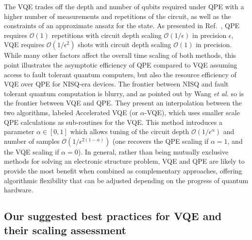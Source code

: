 The VQE trades off the depth and number of qubits required under QPE with a higher number of measurements and repetitions of the circuit, as well as the constraints of an approximate ansatz for the state. As presented in Ref.~\cite{Wang2019}, QPE requires $\mathcal{O}(1)$ repetitions with circuit depth scaling $\mathcal{O}(1/\epsilon)$ in precision $\epsilon$, VQE requires $\mathcal{O}(1/\epsilon^2)$ shots with circuit depth scaling $\mathcal{O}(1)$ in precision. While many other factors affect the overall time scaling of both methods, this point illustrates the asymptotic efficiency of QPE compared to VQE assuming access to fault tolerant quantum computers, but also the resource efficiency of VQE over QPE for NISQ-era devices. The frontier between NISQ and fault tolerant quantum computation is blurry, and as pointed out by Wang \textit{et al.} \cite{Wang2019} so is the frontier between VQE and QPE. They present an interpolation between the two algorithms, labeled Accelerated VQE (or $\alpha$-VQE), which uses smaller scale QPE calculations as sub-routines for the VQE. This method introduces a parameter $\alpha \in [0, 1]$ which allows tuning of the circuit depth $\mathcal{O}(1/\epsilon^{\alpha})$ and number of samples $\mathcal{O}(1/\epsilon^{2(1 - \alpha)})$ (one recovers the QPE scaling if $\alpha=1$, and the VQE scaling if $\alpha=0$). In general, rather than being mutually exclusive methods for solving an electronic structure problem, VQE and QPE are likely to provide the most benefit when combined as complementary approaches, offering algorithmic flexibility that can be adjusted depending on the progress of quantum hardware. 

\subsection{Our suggested best practices for VQE and their scaling assessment} \label{sec:sota_vqe}

